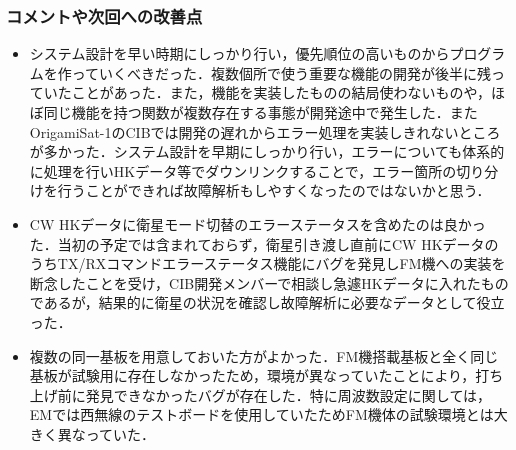 \subsubsection{コメントや次回への改善点}
\begin{itemize}
	\item システム設計を早い時期にしっかり行い，優先順位の高いものからプログラムを作っていくべきだった．複数個所で使う重要な機能の開発が後半に残っていたことがあった．また，機能を実装したものの結局使わないものや，ほぼ同じ機能を持つ関数が複数存在する事態が開発途中で発生した．またOrigamiSat-1のCIBでは開発の遅れからエラー処理を実装しきれないところが多かった．システム設計を早期にしっかり行い，エラーについても体系的に処理を行いHKデータ等でダウンリンクすることで，エラー箇所の切り分けを行うことができれば故障解析もしやすくなったのではないかと思う．
	\item CW HKデータに衛星モード切替のエラーステータスを含めたのは良かった．当初の予定では含まれておらず，衛星引き渡し直前にCW HKデータのうちTX/RXコマンドエラーステータス機能にバグを発見しFM機への実装を断念したことを受け，CIB開発メンバーで相談し急遽HKデータに入れたものであるが，結果的に衛星の状況を確認し故障解析に必要なデータとして役立った．
	\item 複数の同一基板を用意しておいた方がよかった．FM機搭載基板と全く同じ基板が試験用に存在しなかったため，環境が異なっていたことにより，打ち上げ前に発見できなかったバグが存在した．特に周波数設定に関しては，EMでは西無線のテストボードを使用していたためFM機体の試験環境とは大きく異なっていた．
\end{itemize}
